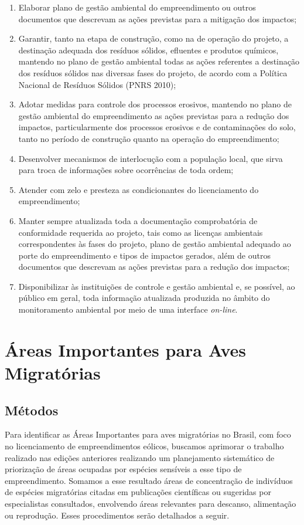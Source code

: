 \documentclass[
]{scrbook}
\begin{document}
\begin{enumerate}
\item
  Elaborar plano de gestão ambiental do empreendimento ou outros documentos que descrevam as ações previstas para a mitigação dos impactos;
\item
  Garantir, tanto na etapa de construção, como na de operação do projeto, a destinação adequada dos resíduos sólidos, efluentes e produtos químicos, mantendo no plano de gestão ambiental todas as ações referentes a destinação dos resíduos sólidos nas diversas fases do projeto, de acordo com a Política Nacional de Resíduos Sólidos (PNRS 2010);
\item
  Adotar medidas para controle dos processos erosivos, mantendo no plano de gestão ambiental do empreendimento as ações previstas para a redução dos impactos, particularmente dos processos erosivos e de contaminações do solo, tanto no período de construção quanto na operação do empreendimento;
\item
  Desenvolver mecanismos de interlocução com a população local, que sirva para troca de informações sobre ocorrências de toda ordem;
\item
  Atender com zelo e presteza as condicionantes do licenciamento do empreendimento;
\item
  Manter sempre atualizada toda a documentação comprobatória de conformidade requerida ao projeto, tais como as licenças ambientais correspondentes às fases do projeto, plano de gestão ambiental adequado ao porte do empreendimento e tipos de impactos gerados, além de outros documentos que descrevam as ações previstas para a redução dos impactos;
\item
  Disponibilizar às instituições de controle e gestão ambiental e, se possível, ao público em geral, toda informação atualizada produzida no âmbito do monitoramento ambiental por meio de uma interface \emph{on-line}.
\end{enumerate}

\hypertarget{areas-importantes}{%
\section{Áreas Importantes para Aves Migratórias}\label{areas-importantes}}

\hypertarget{metodos}{%
\subsection{Métodos}\label{metodos}}

Para identificar as Áreas Importantes para aves migratórias no Brasil, com foco no licenciamento de empreendimentos eólicos, buscamos aprimorar o trabalho realizado nas edições anteriores realizando um planejamento sistemático de priorização de áreas ocupadas por espécies sensíveis a esse tipo de empreendimento. Somamos a esse resultado áreas de concentração de indivíduos de espécies migratórias citadas em publicações científicas ou sugeridas por especialistas consultados, envolvendo áreas relevantes para descanso, alimentação ou reprodução. Esses procedimentos serão detalhados a seguir.
\end{document}
